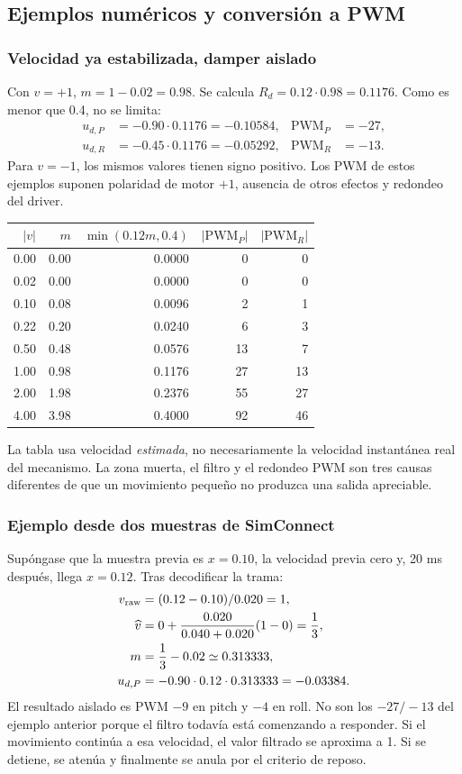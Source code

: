 \subsection{Ejemplos numéricos y conversión a PWM}
\subsubsection{Velocidad ya estabilizada, damper aislado}
Con $v=+1$, $m=1-0.02=0.98$. Se calcula $R_d=0.12\cdot0.98=0.1176$. Como es menor que 0.4, no se limita:
\begin{align}
u_{d,P}&=-0.90\cdot0.1176=-0.10584,& \mathrm{PWM}_P&=-27,\\
u_{d,R}&=-0.45\cdot0.1176=-0.05292,& \mathrm{PWM}_R&=-13.
\end{align}
Para $v=-1$, los mismos valores tienen signo positivo. Los PWM de estos ejemplos suponen polaridad de motor $+1$, ausencia de otros efectos y redondeo del driver.

\begin{center}
\begin{tabular}{rrrrr}
\toprule
$|v|$ & $m$ & $\min(0.12m,0.4)$ & $|\mathrm{PWM}_P|$ & $|\mathrm{PWM}_R|$\\
\midrule
0.00 & 0.00 & 0.0000 & 0 & 0\\
0.02 & 0.00 & 0.0000 & 0 & 0\\
0.10 & 0.08 & 0.0096 & 2 & 1\\
0.22 & 0.20 & 0.0240 & 6 & 3\\
0.50 & 0.48 & 0.0576 & 13 & 7\\
1.00 & 0.98 & 0.1176 & 27 & 13\\
2.00 & 1.98 & 0.2376 & 55 & 27\\
4.00 & 3.98 & 0.4000 & 92 & 46\\
\bottomrule
\end{tabular}
\end{center}
La tabla usa velocidad \emph{estimada}, no necesariamente la velocidad instantánea real del mecanismo. La zona muerta, el filtro y el redondeo PWM son tres causas diferentes de que un movimiento pequeño no produzca una salida apreciable.

\subsubsection{Ejemplo desde dos muestras de SimConnect}
Supóngase que la muestra previa es $x=0.10$, la velocidad previa cero y, 20 ms después, llega $x=0.12$. Tras decodificar la trama:
\begin{align}
v_{\rm raw}&=(0.12-0.10)/0.020=1,\\
\widehat v&=0+\frac{0.020}{0.040+0.020}(1-0)=\frac13,\\
m&=\frac13-0.02\simeq0.313333,\\
u_{d,P}&=-0.90\cdot0.12\cdot0.313333=-0.03384.
\end{align}
El resultado aislado es PWM $-9$ en pitch y $-4$ en roll. No son los $-27/-13$ del ejemplo anterior porque el filtro todavía está comenzando a responder. Si el movimiento continúa a esa velocidad, el valor filtrado se aproxima a 1. Si se detiene, se atenúa y finalmente se anula por el criterio de reposo.

